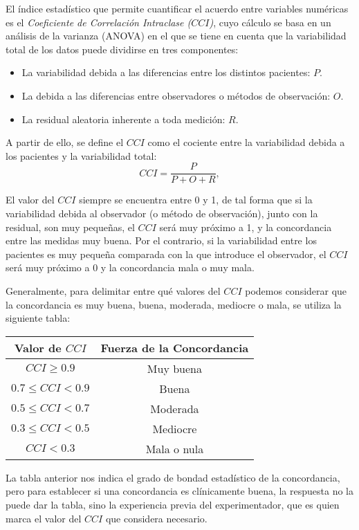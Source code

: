 El índice estadístico que permite cuantificar el acuerdo entre variables numéricas es el \emph{Coeficiente de Correlación Intraclase
($CCI$)}, cuyo cálculo se basa en un análisis de la varianza (ANOVA) en el que se tiene en cuenta que la variabilidad total de los datos
puede dividirse en tres componentes:

\begin{itemize}
\item La variabilidad debida a las diferencias entre los distintos pacientes: $P$.
\item La debida a las diferencias entre observadores o métodos de observación: $O$.
\item La residual aleatoria inherente a toda medición: $R$.
\end{itemize}

A partir de ello, se define el $CCI$ como el cociente entre la variabilidad debida a los pacientes y la variabilidad total:
\[
CCI  = \frac{P} {P+O+R},
\]

El valor del $CCI$ siempre se encuentra entre 0 y 1, de tal forma que si la variabilidad debida al observador (o método de observación),
junto con la residual, son muy pequeñas, el $CCI$ será muy próximo a 1, y la concordancia entre las medidas muy buena. Por el contrario, si
la variabilidad entre los pacientes es muy pequeña comparada con la que introduce el observador, el $CCI$ será muy próximo a 0 y la
concordancia mala o muy mala.

Generalmente, para delimitar entre qué valores del $CCI$ podemos considerar que la concordancia es muy buena, buena, moderada, mediocre o
mala, se utiliza la siguiente tabla:

\begin{center}
\begin{tabular}{|c|c|}
\hline
Valor de $CCI$ & Fuerza de la Concordancia \\
\hline\hline
$CCI \geq 0.9$ & Muy buena  \\
\hline
$0.7\leq CCI<0.9$ & Buena  \\
\hline
$0.5\leq CCI<0.7$ & Moderada  \\
\hline
$0.3\leq CCI<0.5$ & Mediocre  \\
\hline
$CCI<0.3$ & Mala o nula  \\
\hline
\end{tabular}
\end{center}

La tabla anterior nos indica el grado de bondad estadístico de la concordancia, pero para establecer si una concordancia es clínicamente
buena, la respuesta no la puede dar la tabla, sino la experiencia previa del experimentador, que es quien marca el valor del $CCI$ que
considera necesario.


